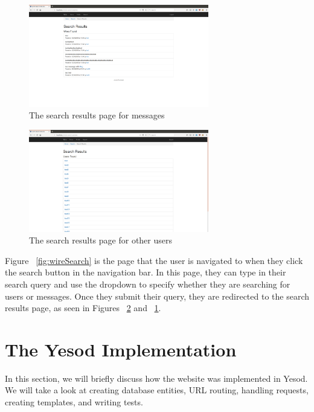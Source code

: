 \begin{figure}[H]
	\centering
	\includegraphics[width=0.7\textwidth]{final_report/pics/searchWire.png}
	\caption{The search results page for messages}
	\label{fig:wireSearchWire}
\end{figure}

\begin{figure}[H]
	\centering
	\includegraphics[width=0.7\textwidth]{final_report/pics/searchUser.png}
	\caption{The search results page for other users}
	\label{fig:wireSearchUser}
\end{figure}

Figure ~\ref{fig:wireSearch} is the page that the user is navigated to when they
click the search button in the navigation bar. In this page, they can type in
their search query and use the dropdown to specify whether they are searching
for users or messages. Once they submit their query, they are redirected to
the search results page, as seen in Figures ~\ref{fig:wireSearchUser} and
~\ref{fig:wireSearchWire}.

\section{The Yesod Implementation}

In this section, we will briefly discuss how the website was implemented in Yesod.
We will take a look at creating database entities, URL routing, handling requests,
creating templates, and writing tests.

